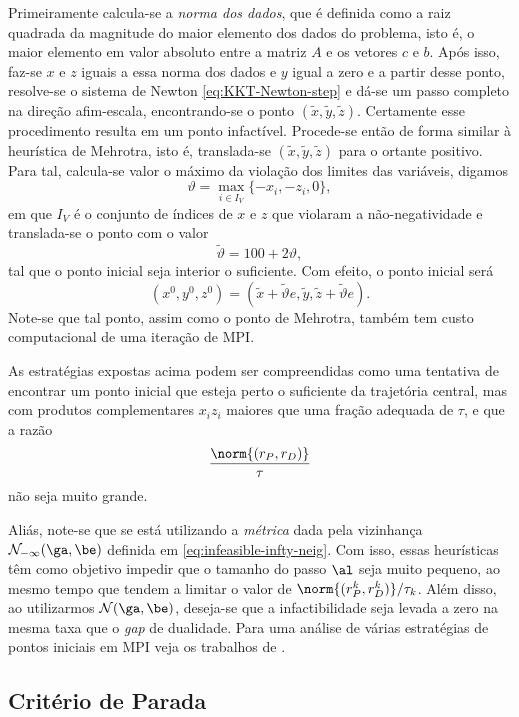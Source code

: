 Primeiramente calcula-se a \emph{norma dos dados}, que é definida como a raiz
quadrada da magnitude do maior elemento dos dados do problema, isto é, o maior
elemento em valor absoluto entre a matriz $A$ e os vetores $c$ e  $b$.
Após isso, faz-se $x$ e $z$ iguais a essa norma dos dados e $y$ igual a zero e a
partir desse ponto, resolve-se o sistema de Newton \eqref{eq:KKT-Newton-step} e
dá-se  um passo completo na direção afim-escala, encontrando-se o ponto
$(\tilde{x},\tilde{y},\tilde{z})$. Certamente esse procedimento resulta em um
ponto infactível. Procede-se então de forma similar à heurística de Mehrotra,
isto é, translada-se $(\tilde{x},\tilde{y},\tilde{z})$ para o ortante positivo. 
Para tal, calcula-se valor
o máximo da violação dos limites das variáveis, digamos 
\[ \vartheta =
\max_{i\in I_V}\{-x_i,-z_i,0\}, \] em que $I_V$ é o conjunto de índices de $x$ e $z$
que violaram a não-negatividade e translada-se o ponto com o valor \[
\tilde{\vartheta}  = 100 + 2\vartheta, \] tal que o ponto inicial seja interior
o suficiente. Com efeito, o ponto inicial será \[ (x^0,y^0,z^0) = (\tilde{x}+
\tilde{\vartheta} e,\tilde{y},\tilde{z}+\tilde{\vartheta} e).
\]
Note-se que tal ponto, assim como o ponto de Mehrotra, também tem custo
computacional de uma iteração de \ac{MPI}.

 As estratégias expostas acima podem ser compreendidas
como uma tentativa de encontrar um ponto inicial que esteja perto o suficiente
da trajetória central, mas com  produtos complementares $x_iz_i$ 
maiores que uma fração adequada de $\tau$, e que a razão \[
\frac{\norm{(r_P,r_D)}}{\tau}
\] não seja muito grande. 

Aliás, note-se que se está  utilizando a \emph{métrica} dada pela vizinhança
$\Nset_{-\infty}(\ga,\be)$ definida em \eqref{eq:infeasible-infty-neig}. Com isso, essas
heurísticas têm como objetivo impedir que o tamanho do passo $\al$ seja muito
pequeno, ao mesmo tempo que tendem a limitar  o valor de $\norm{(r_P^k
,r_D^k)}/{\tau_k}$. Além disso, ao utilizarmos $\Nset(\ga,\be)$, deseja-se que a
infactibilidade seja levada a zero na mesma taxa que o \emph{gap} de dualidade.
Para uma  análise de várias estratégias de pontos iniciais em
\ac{MPI} veja os trabalhos de \textcite{Gertz:2004cw,DApuzzo:2009ks,Andersen:1996un,Vanderbei:1999wv}.




  
\subsection{Critério de Parada}

